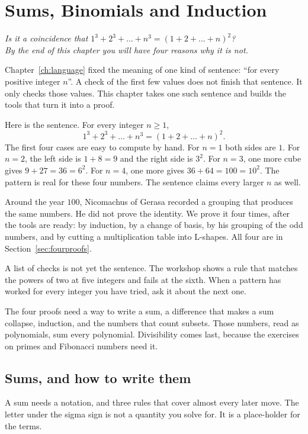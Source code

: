 \chapter{Sums, Binomials and Induction}\label{ch:sums}

\begin{center}\itshape
Is it a coincidence that $1^3+2^3+\dots+n^3=(1+2+\dots+n)^2$?\\
By the end of this chapter you will have four reasons why it is not.
\end{center}

Chapter~\ref{ch:language} fixed the meaning of one kind of sentence: ``for every positive integer $n$''. A check of the first few values does not finish that sentence. It only checks those values. This chapter takes one such sentence and builds the tools that turn it into a proof.

Here is the sentence. For every integer $n\ge1$,
\[
1^3+2^3+\dots+n^3=(1+2+\dots+n)^2.
\]
The first four cases are easy to compute by hand. For $n=1$ both sides are $1$. For $n=2$, the left side is $1+8=9$ and the right side is $3^2$. For $n=3$, one more cube gives $9+27=36=6^2$. For $n=4$, one more gives $36+64=100=10^2$. The pattern is real for these four numbers. The sentence claims every larger $n$ as well.

Around the year $100$, Nicomachus of Gerasa recorded a grouping that produces the same numbers. He did not prove the identity. We prove it four times, after the tools are ready: by induction, by a change of basis, by his grouping of the odd numbers, and by cutting a multiplication table into L-shapes. All four are in Section~\ref{sec:fourproofs}.

A list of checks is not yet the sentence. The workshop shows a rule that matches the powers of two at five integers and fails at the sixth. When a pattern has worked for every integer you have tried, ask it about the next one.

The four proofs need a way to write a sum, a difference that makes a sum collapse, induction, and the numbers that count subsets. Those numbers, read as polynomials, sum every polynomial. Divisibility comes last, because the exercises on primes and Fibonacci numbers need it.

\section{Sums, and how to write them}\label{sec:sums}

A sum needs a notation, and three rules that cover almost every later move. The letter under the sigma sign is not a quantity you solve for. It is a place-holder for the terms.


